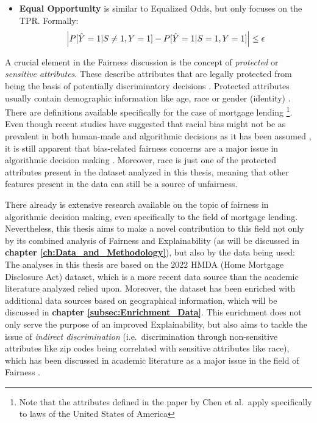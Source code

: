 \begin{itemize}
    \item \textbf{Equal Opportunity} is similar to Equalized Odds, but only focuses on the TPR. Formally:
    \begin{equation}
    \left| P[\hat{Y} = 1|S \neq 1, Y = 1] - P[\hat{Y} = 1|S = 1, Y = 1] \right| \leq \epsilon
    \label{eq:equal_opportunity}
    \addcontentsline{frm}{formulas}{\protect\numberline{\theequation}\hspace{1em}Equal Opportunity}
    \end{equation}
\end{itemize}

A crucial element in the Fairness discussion is the concept of \textit{protected} or \textit{sensitive attributes}. These describe attributes that are legally protected from being the basis of potentially discriminatory decisions \parencite{Datta2017}.
Protected attributes usually contain demographic information like age, race or gender (identity) \parencite{Teodorescu2020}. There are definitions available specifically for the case of mortgage lending \parencite{Chen2019}\footnote{Note that the attributes defined in the paper by Chen et al.\ apply specifically to laws of the United States of America}. 
Even though recent studies have suggested that racial bias might not be as prevalent in both human-made and algorithmic decisions as it has been assumed \parencite{Bhutta2022}, 
it is still apparent that bias-related fairness concerns are a major issue in algorithmic decision making \parencite{Mehrabi2021}.
Moreover, race is just one of the protected attributes present in the dataset analyzed in this thesis, meaning that other features present in the data can still be a source of unfairness.

There already is extensive research available on the topic of fairness in algorithmic decision making, even specifically to the field of mortgage lending.
Nevertheless, this thesis aims to make a novel contribution to this field not only by its combined analysis of Fairness and Explainability (as will be discussed in \textbf{chapter \ref{ch:Data_and_Methodology}}),
but also by the data being used: The analyses in this thesis are based on the 2022 HMDA (Home Mortgage Disclosure Act) dataset, which is a more recent data source than the academic literature analyzed relied upon.
Moreover, the dataset has been enriched with additional data sources based on geographical information, which will be discussed in \textbf{chapter \ref{subsec:Enrichment_Data}}.
This enrichment does not only serve the purpose of an improved Explainability, but also aims to tackle the issue of \textit{indirect discrimination} (i.e.\ discrimination through non-sensitive attributes like zip codes being correlated with sensitive attributes like race), 
which has been discussed in academic literature as a major issue in the field of Fairness \parencite{Mehrabi2021}.

